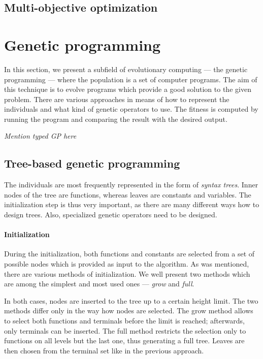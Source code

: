 \subsection{Multi-objective optimization}

\section{Genetic programming}
In this section, we present a subfield of evolutionary computing --- 
the genetic programming --- where the population is a set of computer 
programs. The aim of this technique is to evolve programs which provide 
a good solution to the given problem. There are various approaches in means 
of how to represent the individuals and what kind of genetic operators to 
use. The fitness is computed by running the program and comparing the result 
with the desired output. \cite{Poli:2008:FGG:1796422}

\textit{Mention typed GP here}
\subsection{Tree-based genetic programming}
The individuals are most frequently represented in the form of 
\emph{syntax trees}. Inner nodes of the tree are functions, whereas leaves 
are constants and variables. The initialization step is thus very important, as
there are many different ways how to design trees. Also, specialized genetic
operators need to be designed.

\paragraph{Initialization}
During the initialization, both functions and constants are selected from a set
of possible nodes which is provided as input to the algorithm. As was mentioned,
there are various methods of initialization. We well present two methods which
are among the simplest and most used ones --- \emph{grow} and \emph{full}.

In both cases, nodes are inserted to the tree up to a certain height limit.
The two methods differ only in the way how nodes are selected. The grow method
allows to select both functions and terminals before the limit is reached;
afterwards, only terminals can be inserted. The full method restricts the
selection only to functions on all levels but the last one, thus generating 
a full tree. Leaves are then
chosen from the terminal set like in the previous approach.

